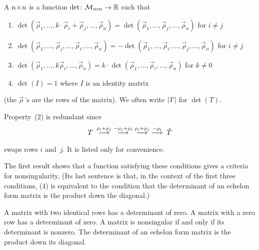 \begin{definition}
\label{def:Det}
A \( n \! \times \! n \) %
 is a function
\( \mbox{$\det\colon \mathcal{M}_{n \! \times \! n}\to \mathbb{R}$} \) such that
\begin{enumerate}
  \item
    $
       \det (\vec{\rho}_1,\dots,k\cdot\vec{\rho}_i 
                                    + \vec{\rho}_j,\dots,\vec{\rho}_n)
       =\det (\vec{\rho}_1,\dots,\vec{\rho}_j,\dots,\vec{\rho}_n)
    $ for \( i\ne j \)
  \item 
    $
       \det (\vec{\rho}_1,\ldots,\vec{\rho}_j,
               \dots,\vec{\rho}_i,\dots,\vec{\rho}_n)
       = -\det (\vec{\rho}_1,\dots,\vec{\rho}_i,\dots,\vec{\rho}_j,
                \dots,\vec{\rho}_n)
    $
    for \( i\ne j\)
  \item
    $
       \det (\vec{\rho}_1,\dots,k\vec{\rho}_i,\dots,\vec{\rho}_n)
       = k\cdot \det (\vec{\rho}_1,\dots,\vec{\rho}_i,\dots,\vec{\rho}_n)
    $
    for \( k\ne 0\)
  \item 
     $
       \det(I)=1
     $
     where \( I \) is an identity matrix
\end{enumerate}
(the $\vec{\rho}\,$'s are the rows of the matrix).
We often write \( \deter{T} \) for \( \det (T) \).
\end{definition}

\begin{remark}  \label{rem:SwapRowsRedun}
Property~(2) is redundant since
\begin{equation*}
   T\;\mathrel{ \mathop{\longrightarrow}\limits^{\rho_i+\rho_j\mathstrut}_{ \begin{subarray}{l} \relax \end{subarray}}}
    \;\mathrel{ \mathop{\longrightarrow}\limits^{-\rho_j+\rho_i\mathstrut}_{ \begin{subarray}{l} \relax \end{subarray}}}
    \;\mathrel{ \mathop{\longrightarrow}\limits^{\rho_i+\rho_j\mathstrut}_{ \begin{subarray}{l} \relax \end{subarray}}}
    \;\mathrel{ \mathop{\longrightarrow}\limits^{-\rho_i\mathstrut}_{ \begin{subarray}{l} \relax \end{subarray}}}
    \;\hat{T}
\end{equation*}
swaps rows \( i \) and~\( j \).
It is listed only for convenience.
\end{remark}

The first result shows that a function satisfying these conditions
gives a criteria for nonsingularity.
(Its last sentence is that, in the context of the first
three conditions, (4) is equivalent to the condition
that the determinant of an echelon form matrix is the product down the 
diagonal.)

\begin{lemma}   \label{le:IdenRowsDetZero}
A matrix with two identical rows has a determinant of zero.
A matrix with a zero row has a determinant of zero.
A matrix is nonsingular if and only if its determinant is nonzero.
The determinant of an echelon form matrix is the product down its diagonal.
\end{lemma}

